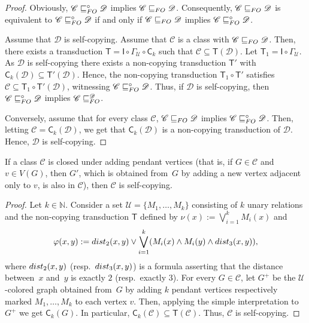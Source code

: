 \documentclass{lmcs}
\newcommand{\Cc}{\mathscr{C}}
\newcommand{\Dd}{\mathscr{D}}
\renewcommand{\phi}{\varphi}
\renewcommand{\FO}{{\rm FO}}
\theoremstyle{definition}
\newcommand{\dnnc}{is self-copying\xspace}
\begin{document}
\begin{proof}
	Obviously, $\Cc\sqsubseteq_\FO^\circ\Dd$ implies $\Cc\sqsubseteq_\FO\Dd$.
	Consequently,  	$\Cc\sqsubseteq_\FO\Dd$ is equivalent to $\Cc\sqsubseteq_\FO^\circ\Dd$ if and only if $\Cc\sqsubseteq_\FO\Dd$ implies $\Cc\sqsubseteq_\FO^\circ\Dd$.
	
	
	Assume that $\Dd$ \dnnc.
	Assume that $\Cc$ is a class with $\Cc\sqsubseteq_\FO\Dd$. Then, there exists a transduction $\mathsf T=\mathsf I\circ\Gamma_{\mathcal U}\circ\mathsf C_k$ such that 
	$\Cc\subseteq \mathsf T(\Dd)$.
	Let $\mathsf T_1=\mathsf I\circ\Gamma_{\mathcal U}$.
	As $\Dd$ \dnnc there exists a non-copying transduction $\mathsf T'$ with $\mathsf C_k(\Dd)\subseteq \mathsf T'(\Dd)$.
	Hence, the non-copying transduction  $\mathsf T_1\circ\mathsf T'$ satisfies $\Cc\subseteq \mathsf T_1\circ\mathsf T'(\Dd)$, witnessing $\Cc\sqsubseteq_\FO^\circ\Dd$.
	Thus, if $\Dd$ \dnnc, then
	$\Cc\sqsubseteq_\FO^\circ\Dd$ implies $\Cc\sqsubseteq_\FO^\Dd$.
	
	Conversely, assume that for every class $\Cc$,  $\Cc\sqsubseteq_\FO\Dd$ implies 
	$\Cc\sqsubseteq_\FO^\circ\Dd$. Then, letting $\Cc=\mathsf C_k(\Dd)$, we get that $\mathsf C_k(\Dd)$ is a non-copying transduction of $\Dd$. Hence, $\Dd$ \dnnc.
\end{proof}

\begin{fact}\label{fact:non-copy-classes}
	If a class $\Cc$ is closed under adding pendant vertices (that is, if $G\in \Cc$
	and $v\in V(G)$, then $G'$, which is obtained from~$G$ by adding a new
	vertex adjacent only to $v$, is also in $\Cc$), then $\Cc$ \dnnc.
\end{fact}
\begin{proof}[Proof]
	Let $k\in\mathbb N$. Consider a set $\mathcal U=\{M_1,\dots, M_k\}$ consisting of $k$ unary relations and the non-copying transduction $\mathsf T$ defined by $\nu(x):=\bigvee_{i=1}^k M_i(x)$ and 
	\[\phi(x,y):= {\rm dist}_{2}(x,y)\vee \bigvee_{i=1}^k (M_i(x)\wedge M_i(y)\wedge {\rm dist}_3(x,y)),\]
	where ${\rm dist}_2(x,y)$ (resp.\ ${\rm dist}_3(x,y)$) is a formula asserting that the distance between~$x$ and~$y$ is exactly $2$ (resp.\ exactly $3$).
	For every $G\in\Cc$, let $G^+$ be the $\mathcal U$-colored graph obtained from~$G$ by adding  $k$ pendant vertices respectively marked $M_1,\dots,M_k$  to each vertex $v$. Then, applying the simple interpretation to $G^+$ we get $\mathsf C_k(G)$. In particular, $\mathsf C_k(\Cc)\subseteq \mathsf T(\Cc)$. Thus, $\Cc$ \dnnc.
\end{proof}
\end{document}
